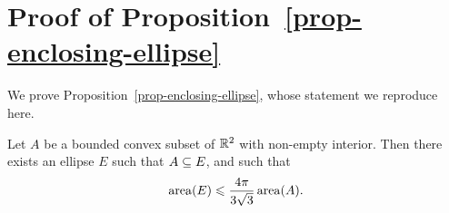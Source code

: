 \section[Proof of Proposition 5.17]{Proof of Proposition~\ref{prop-enclosing-ellipse}}
\label{app-enclosing-ellipse}

We prove Proposition~\ref{prop-enclosing-ellipse}, whose statement we 
reproduce here.

\begin{un-proposition}
  Let $A$ be a bounded convex subset of ${\mathbb{R}}^2$ with non-empty
  interior. Then there exists an ellipse $E$ such that $A\subseteq E$, and
  such that 
  \begin{equation}\label{eqn-area-EA}
    \mathop{\rm area}\nolimits(E) \leqslant \frac{4\pi}{3\sqrt 3}\mathop{\rm area}\nolimits(A). 
  \end{equation}
\end{un-proposition}

